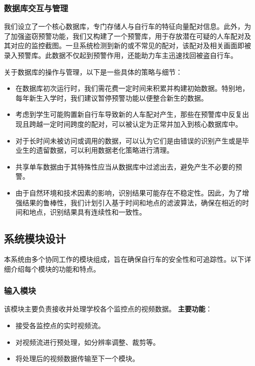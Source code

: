 \documentclass{article}
\begin{document}
\subsubsection{数据库交互与管理}

我们设立了一个核心数据库，专门存储人与自行车的特征向量配对信息。此外，为了加强盗窃预警功能，我们又构建了一个预警库，用于存放潜在可疑的人车配对及其对应的监控截图。一旦系统检测到新的或不常见的配对，该配对及相关画面即被录入预警库。此数据不仅起到预警作用，还能助力车主迅速找回被盗自行车。

关于数据库的操作与管理，以下是一些具体的策略与细节：

\begin{itemize}
    \item 在数据库初次运行时，我们需花费一定时间来积累并构建初始数据。特别地，每年新生入学时，我们建议暂停预警功能以便整合新生的数据。
    \item 考虑到学生可能购置新自行车导致新的人车配对产生，那些在预警库中反复出现且跨越一定时间跨度的配对，可以被认定为正常并加入到核心数据库中。
    \item 对于长时间未被访问或调用的数据，可以认为它们是由错误的识别产生或是毕业生的遗留数据，可以利用数据老化策略进行清理。
    \item 共享单车数据由于其特殊性应当从数据库中过滤出去，避免产生不必要的预警。
    \item 由于自然环境和技术因素的影响，识别结果可能存在不稳定性。因此，为了增强结果的鲁棒性，我们计划引入基于时间和地点的滤波算法，确保在相近的时间和地点，识别结果具有连续性和一致性。
\end{itemize}

\subsection{系统模块设计}

本系统由多个协同工作的模块组成，旨在确保自行车的安全性和可追踪性。以下详细介绍每个模块的功能和特点。

\subsubsection{输入模块}
该模块主要负责接收并处理学校各个监控点的视频数据。
\newline
\newline
\textbf{主要功能}：
\begin{itemize}
    \item 接受各监控点的实时视频流。
    \item 对视频流进行预处理，如分辨率调整、裁剪等。
    \item 将处理后的视频数据传输至下一个模块。
\end{itemize}
\end{document}
